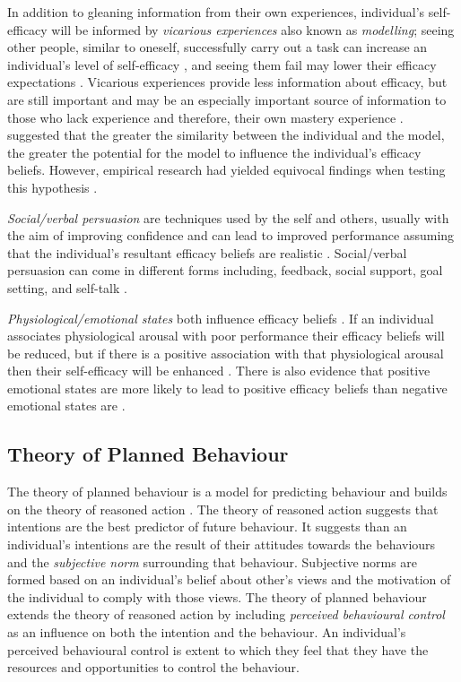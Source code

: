 \documentclass[
  12pt,
  a4paper,
]{book}
\begin{document}
In addition to gleaning information from their own experiences, individual's self-efficacy will be informed by \emph{vicarious experiences} also known as \emph{modelling}; seeing other people, similar to oneself, successfully carry out a task can increase an individual's level of self-efficacy \citep{Bandura1982, Lirgg1991}, and seeing them fail may lower their efficacy expectations \citep{Brown1978}. Vicarious experiences provide less information about efficacy, but are still important \citep{McCullagh2001} and may be an especially important source of information to those who lack experience and therefore, their own mastery experience \citep{Weinberg2014}. \citet{Bandura1986} suggested that the greater the similarity between the individual and the model, the greater the potential for the model to influence the individual's efficacy beliefs. However, empirical research had yielded equivocal findings when testing this hypothesis \citep[see][]{Samson2011}.

\emph{Social/verbal persuasion} are techniques used by the self and others, usually with the aim of improving confidence and can lead to improved performance assuming that the individual's resultant efficacy beliefs are realistic \citep{Bandura1982}. Social/verbal persuasion can come in different forms including, feedback, social support, goal setting, and self-talk \citep{Samson2011}.

\emph{Physiological/emotional states} both influence efficacy beliefs \citep{Bandura1977, Bandura1982}. If an individual associates physiological arousal with poor performance their efficacy beliefs will be reduced, but if there is a positive association with that physiological arousal then their self-efficacy will be enhanced \citep{Hauck2008, Jones1995, Jones1992}. There is also evidence that positive emotional states are more likely to lead to positive efficacy beliefs than negative emotional states are \citep{Maddux1995, Martin2002}.

\hypertarget{theory-of-planned-behaviour}{%
\subsection{Theory of Planned Behaviour}\label{theory-of-planned-behaviour}}

The theory of planned behaviour \citep{Ajzen1991, Ajzen1986} is a model for predicting behaviour and builds on the theory of reasoned action \citep{Ajzen1980}. The theory of reasoned action suggests that intentions are the best predictor of future behaviour. It suggests than an individual's intentions are the result of their attitudes towards the behaviours and the \emph{subjective norm} surrounding that behaviour. Subjective norms are formed based on an individual's belief about other's views and the motivation of the individual to comply with those views. The theory of planned behaviour extends the theory of reasoned action by including \emph{perceived behavioural control} as an influence on both the intention and the behaviour. An individual's perceived behavioural control is extent to which they feel that they have the resources and opportunities to control the behaviour.
\end{document}
